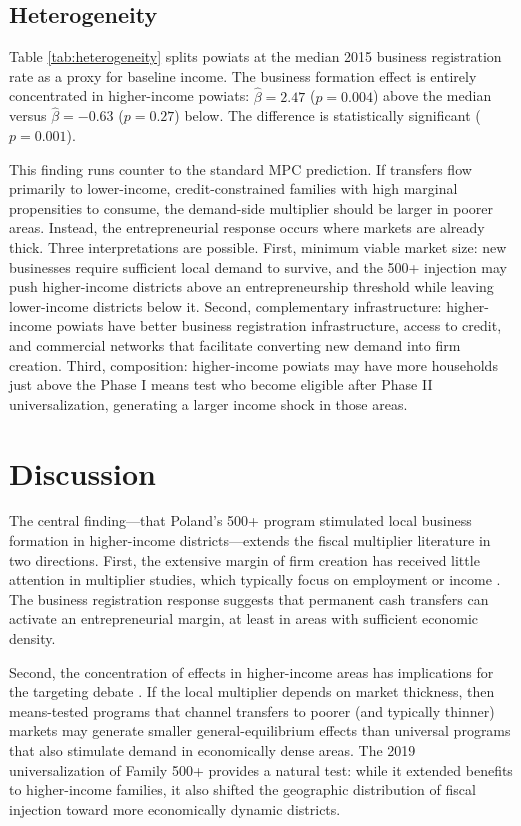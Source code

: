 \documentclass[12pt]{article}
\begin{document}
\subsection{Heterogeneity}



Table \ref{tab:heterogeneity} splits powiats at the median 2015 business registration rate as a proxy for baseline income. The business formation effect is entirely concentrated in higher-income powiats: $\hat{\beta} = 2.47$ ($p = 0.004$) above the median versus $\hat{\beta} = -0.63$ ($p = 0.27$) below. The difference is statistically significant ($p = 0.001$).

This finding runs counter to the standard MPC prediction. If transfers flow primarily to lower-income, credit-constrained families with high marginal propensities to consume, the demand-side multiplier should be larger in poorer areas. Instead, the entrepreneurial response occurs where markets are already thick. Three interpretations are possible. First, minimum viable market size: new businesses require sufficient local demand to survive, and the 500+ injection may push higher-income districts above an entrepreneurship threshold while leaving lower-income districts below it. Second, complementary infrastructure: higher-income powiats have better business registration infrastructure, access to credit, and commercial networks that facilitate converting new demand into firm creation. Third, composition: higher-income powiats may have more households just above the Phase I means test who become eligible after Phase II universalization, generating a larger income shock in those areas.


\section{Discussion}

The central finding---that Poland's 500+ program stimulated local business formation in higher-income districts---extends the fiscal multiplier literature in two directions. First, the extensive margin of firm creation has received little attention in multiplier studies, which typically focus on employment \citep{chodorow2019geographic} or income \citep{nakamura2014fiscal}. The business registration response suggests that permanent cash transfers can activate an entrepreneurial margin, at least in areas with sufficient economic density.

Second, the concentration of effects in higher-income areas has implications for the targeting debate \citep{hanna2018universal}. If the local multiplier depends on market thickness, then means-tested programs that channel transfers to poorer (and typically thinner) markets may generate smaller general-equilibrium effects than universal programs that also stimulate demand in economically dense areas. The 2019 universalization of Family 500+ provides a natural test: while it extended benefits to higher-income families, it also shifted the geographic distribution of fiscal injection toward more economically dynamic districts.
\end{document}
